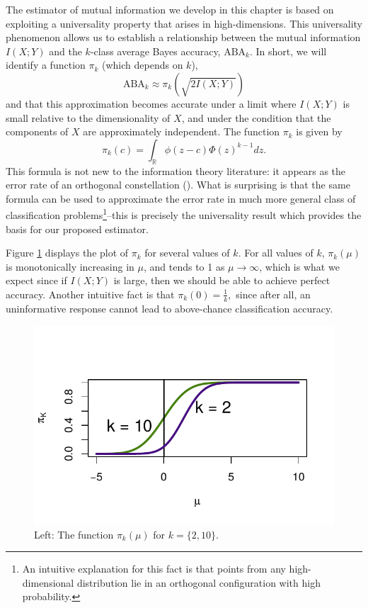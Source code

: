 The estimator of mutual information we develop in this chapter is
based on exploiting a universality property that arises in
high-dimensions.  This universality phenomenon allows us to establish
a relationship between the mutual information $I(X; Y)$ and the
$k$-class average Bayes accuracy, $\text{ABA}_k$.  In short, we will
identify a function $\pi_k$ (which depends on $k$),
\begin{equation}\label{abepi}
\text{ABA}_k \approx \pi_k(\sqrt{2 I(X; Y)})
\end{equation}
and that this approximation becomes accurate under a limit where $I(X;
Y)$ is small relative to the dimensionality of $X$, and under the
condition that the components of $X$ are approximately independent.
The function $\pi_k$ is given by
\[
\pi_k(c) = \int_{\mathbb{R}} \phi(z - c)  \Phi(z)^{k-1} dz.
\]
This formula is not new to the information theory literature: it
appears as the error rate of an orthogonal constellation (\cite{cioffi2014}).  What
is surprising is that the same formula can be used to approximate the
error rate in much more general class of classification
problems\footnote{An intuitive explanation for this fact is that
  points from any high-dimensional distribution lie in an orthogonal
  configuration with high probability.}--this is precisely the
universality result which provides the basis for our proposed
estimator.

Figure \ref{fig:pi} displays the plot of $\pi_k$ for several values of
$k$.  For all values of $k$, $\pi_k(\mu)$ is monotonically increasing
in $\mu$, and tends to 1 as $\mu \to \infty$, which is what we expect
since if $I(X; Y)$ is large, then we should be able to achieve perfect
accuracy.  Another intuitive fact is that $ \pi_k(0) = \frac{1}{k}, $
since after all, an uninformative response cannot lead to above-chance
classification accuracy.


\begin{figure}
\centering
\includegraphics[scale = 0.7, clip=true, trim=0 0.2in 0 0.5in]{Figures/illus_piK_flat_flipped.pdf}
\caption{Left: The function $\pi_k(\mu)$ for $k = \{2, 10\}$.}
\label{fig:pi}
\end{figure}

